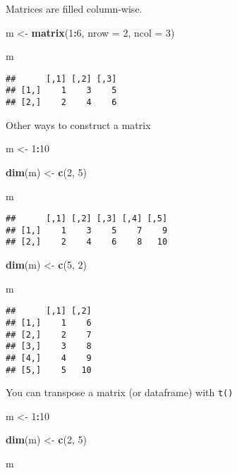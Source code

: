 \documentclass[
]{book}
\newenvironment{Shaded}{\begin{snugshade}}{\end{snugshade}}
\newcommand{\DataTypeTok}[1]{\textcolor[rgb]{0.13,0.29,0.53}{#1}}
\newcommand{\DecValTok}[1]{\textcolor[rgb]{0.00,0.00,0.81}{#1}}
\newcommand{\KeywordTok}[1]{\textcolor[rgb]{0.13,0.29,0.53}{\textbf{#1}}}
\newcommand{\NormalTok}[1]{#1}
\newcommand{\OperatorTok}[1]{\textcolor[rgb]{0.81,0.36,0.00}{\textbf{#1}}}
\newcommand{\StringTok}[1]{\textcolor[rgb]{0.31,0.60,0.02}{#1}}
\begin{document}
Matrices are filled column-wise.

\begin{Shaded}
\begin{Highlighting}[]
\NormalTok{m \textless{}{-}}\StringTok{ }\KeywordTok{matrix}\NormalTok{(}\DecValTok{1}\OperatorTok{:}\DecValTok{6}\NormalTok{, }\DataTypeTok{nrow =} \DecValTok{2}\NormalTok{, }\DataTypeTok{ncol =} \DecValTok{3}\NormalTok{)}

\NormalTok{m}
\end{Highlighting}
\end{Shaded}

\begin{verbatim}
##      [,1] [,2] [,3]
## [1,]    1    3    5
## [2,]    2    4    6
\end{verbatim}

Other ways to construct a matrix

\begin{Shaded}
\begin{Highlighting}[]
\NormalTok{m \textless{}{-}}\StringTok{ }\DecValTok{1}\OperatorTok{:}\DecValTok{10}

\KeywordTok{dim}\NormalTok{(m) \textless{}{-}}\StringTok{ }\KeywordTok{c}\NormalTok{(}\DecValTok{2}\NormalTok{, }\DecValTok{5}\NormalTok{)}

\NormalTok{m}
\end{Highlighting}
\end{Shaded}

\begin{verbatim}
##      [,1] [,2] [,3] [,4] [,5]
## [1,]    1    3    5    7    9
## [2,]    2    4    6    8   10
\end{verbatim}

\begin{Shaded}
\begin{Highlighting}[]
\KeywordTok{dim}\NormalTok{(m) \textless{}{-}}\StringTok{ }\KeywordTok{c}\NormalTok{(}\DecValTok{5}\NormalTok{, }\DecValTok{2}\NormalTok{)}

\NormalTok{m}
\end{Highlighting}
\end{Shaded}

\begin{verbatim}
##      [,1] [,2]
## [1,]    1    6
## [2,]    2    7
## [3,]    3    8
## [4,]    4    9
## [5,]    5   10
\end{verbatim}

You can transpose a matrix (or dataframe) with \texttt{t()}

\begin{Shaded}
\begin{Highlighting}[]
\NormalTok{m \textless{}{-}}\StringTok{ }\DecValTok{1}\OperatorTok{:}\DecValTok{10}

\KeywordTok{dim}\NormalTok{(m) \textless{}{-}}\StringTok{ }\KeywordTok{c}\NormalTok{(}\DecValTok{2}\NormalTok{, }\DecValTok{5}\NormalTok{)}

\NormalTok{m}
\end{Highlighting}
\end{Shaded}
\end{document}

